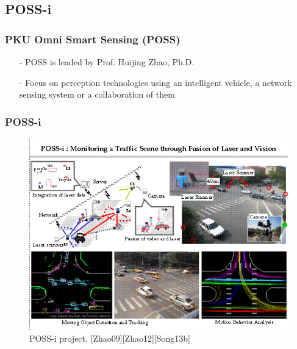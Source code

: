\documentclass[table]{beamer}
\begin{document}
\subsection*{POSS-i}
\frame
{
	\frametitle{PKU Omni Smart Sensing (POSS)}
	\begin{itemize}
		\item[-] POSS is leaded by Prof. Huijing Zhao, Ph.D.
		\item[-] Focus on perception technologies using an intelligent vehicle, a network sensing system or a collaboration of them
	\end{itemize}
}
\frame
{
	\frametitle{POSS-i}	
	\begin{figure}
		\includegraphics[scale=0.4]{fig/possi.png}
		\caption{POSS-i project. [Zhao09][Zhao12][Song13b]}
	\end{figure}
}
\end{document}
